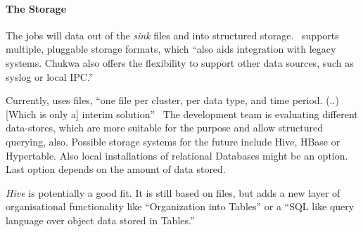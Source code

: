 
\paragraph{The Storage}

The \mr jobs will \demux data out of the \textit{sink} files and into structured storage.~\cite{Boulonb} 
\chuk supports multiple, pluggable storage formats, which ``also aids integration with legacy systems. Chukwa also offers the flexibility to support other data sources, such as syslog or local IPC.''~\cite{Rabkin2010a} 

Currently, \chuk uses \hdfs files, ``one file per cluster, per data type, and time period. (..) [Which is only a] interim solution''~\cite{Boulona} 
The development team is evaluating different data-stores, which are more suitable for the purpose and allow structured querying, also.
Possible storage systems for the future include Hive, HBase or Hypertable. Also local installations of relational Databases might be an option.~\cite{Boulonb} Last option depends on the amount of data stored.

\textit{Hive} is potentially a good fit. It is still based on \hdfs files, but adds a new layer of organisational functionality like ``Organization into Tables'' or a ``SQL like query language over object data stored in Tables.''~\cite{Sarma08}